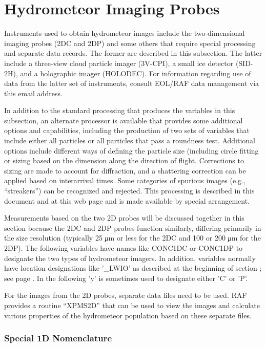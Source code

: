 \documentclass[
  english,
]{book}
\begin{document}
\hypertarget{hydrometeor-imaging-probes}{%
\section{Hydrometeor Imaging Probes}\label{hydrometeor-imaging-probes}}

Instruments used to obtain hydrometeor images include the
two-dimensional imaging probes (2DC and 2DP) and some others that
require special processing and separate data records. The former are
described in this subsection. The latter include a three-view cloud
particle imager (3V-CPI), a small ice detector (SID-2H), and a
holographic imager (HOLODEC). For information regarding use of data from
the latter set of instruments, consult EOL/RAF data management via this
email address.

In addition to the standard processing that produces the variables in
this subsection, an alternate processor is available that provides some
additional options and capabilities, including the production of two
sets of variables that include either all particles or all particles
that pass a roundness test. Additional options include different ways of
defining the particle size (including circle fitting or sizing based on
the dimension along the direction of flight. Corrections to sizing are
made to account for diffraction, and a shattering correction can be
applied based on interarrival times. Some categories of spurious images
(e.g., ``streakers'') can be recognized and rejected. This processing is
described in this document and at this web page and is made available by
special arrangement.

Measurements based on the two 2D probes will be discussed together in
this section because the 2DC and 2DP probes function similarly,
differing primarily in the size resolution (typically 25 {\emph{μ}}m or
less for the 2DC and 100 or 200 {\emph{μ}}m for the 2DP). The following
variables have names like CONC1DC or CONC1DP to designate the two types
of hydrometeor imagers. In addition, variables normally have location
designations like '\_LWIO' as described at the beginning of section ;
see page . In the following 'y' is sometimes used to designate either
'C' or 'P'.

For the images from the 2D probes, separate data files need to be used.
RAF provides a routine ``XPMS2D'' that can be used to view the images
and calculate various properties of the hydrometeor population based on
these separate files.

\hypertarget{special-1d-nomenclature}{%
\subsubsection*{Special 1D Nomenclature}\label{special-1d-nomenclature}}
\end{document}
